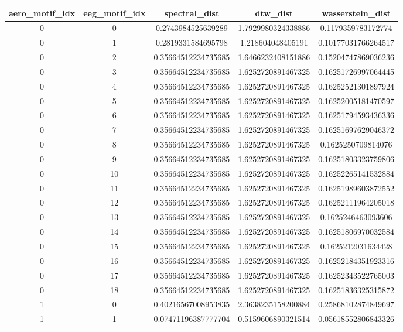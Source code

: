 \documentclass{article}
\begin{document}
\begin{table}[h]
\centering
\begin{tabular}{|c|c|c|c|c|}
\hline
aero\_motif\_idx & eeg\_motif\_idx & spectral\_dist & dtw\_dist & wasserstein\_dist \\
\hline
0 & 0 & 0.2743984525639289 & 1.7929980324338886 & 0.1179359783172774 \\
0 & 1 & 0.2819331584695798 & 1.218604048405191 & 0.10177031766264517 \\
0 & 2 & 0.35664512234735685 & 1.6466232408151886 & 0.15204747869036236 \\
0 & 3 & 0.35664512234735685 & 1.6252720891467325 & 0.16251726997064445 \\
0 & 4 & 0.35664512234735685 & 1.6252720891467325 & 0.16252521301897924 \\
0 & 5 & 0.35664512234735685 & 1.6252720891467325 & 0.16252005181470597 \\
0 & 6 & 0.35664512234735685 & 1.6252720891467325 & 0.16251794593436336 \\
0 & 7 & 0.35664512234735685 & 1.6252720891467325 & 0.16251697629046372 \\
0 & 8 & 0.35664512234735685 & 1.6252720891467325 & 0.1625250709814076 \\
0 & 9 & 0.35664512234735685 & 1.6252720891467325 & 0.16251803323759806 \\
0 & 10 & 0.35664512234735685 & 1.6252720891467325 & 0.16252265141532884 \\
0 & 11 & 0.35664512234735685 & 1.6252720891467325 & 0.16251989603872552 \\
0 & 12 & 0.35664512234735685 & 1.6252720891467325 & 0.16252111964205018 \\
0 & 13 & 0.35664512234735685 & 1.6252720891467325 & 0.1625246463093606 \\
0 & 14 & 0.35664512234735685 & 1.6252720891467325 & 0.16251806970032584 \\
0 & 15 & 0.35664512234735685 & 1.6252720891467325 & 0.1625212031634428 \\
0 & 16 & 0.35664512234735685 & 1.6252720891467325 & 0.16252184351923316 \\
0 & 17 & 0.35664512234735685 & 1.6252720891467325 & 0.16252343522765003 \\
0 & 18 & 0.35664512234735685 & 1.6252720891467325 & 0.16251836325315872 \\
1 & 0 & 0.40216567008953835 & 2.3638235158200884 & 0.25868102874849697 \\
1 & 1 & 0.07471196387777704 & 0.5159606890321514 & 0.05618552806843326 \\

\end{tabular}
\end{table}
\end{document}
